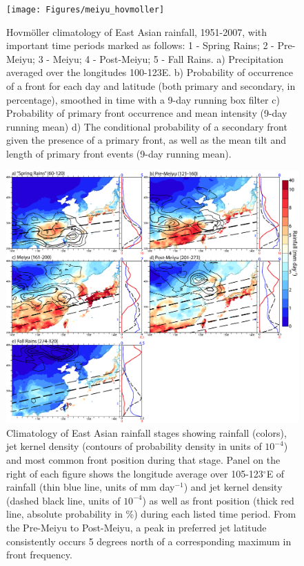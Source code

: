 \documentclass[draft,grl]{AGUTeX}
\begin{document}
\begin{figure}
\label{hov}
\noindent\texttt{[image: Figures/meiyu\_hovmoller]}
\caption{Hovm\"oller climatology of East Asian rainfall, 1951-2007, with important time periods marked as follows: 1 - Spring Rains; 2 - Pre-Meiyu; 3 - Meiyu; 4 - Post-Meiyu; 5 - Fall Rains. a) Precipitation averaged over the longitudes 100-123\textdegree E. b) Probability of occurrence of a front for each day and latitude (both primary and secondary, in percentage), smoothed in time with a 9-day running box filter c) Probability of primary front occurrence and mean intensity (9-day running mean) d) The conditional probability of a secondary front given the presence of a primary front, as well as the mean tilt and length of primary front events (9-day running mean).}
\end{figure}

\begin{figure}
\label{climo}
\noindent\includegraphics[width=36pc]{Figures/climo}
\caption{Climatology of East Asian rainfall stages showing rainfall (colors), jet kernel density (contours of probability density in units of $10^{-4}$) and most common front position during that stage. Panel on the right of each figure shows the longitude average over 105-123$^{\circ}$E of rainfall (thin blue line, units of mm day$^{-1}$) and jet kernel density (dashed black line, units of $10^{-4}$) as well as front position (thick red line, absolute probability in \%) during each listed time period. From the Pre-Meiyu to Post-Meiyu, a peak in preferred jet latitude consistently occurs 5 degrees north of a corresponding maximum in front frequency.}
\end{figure}
\end{document}
